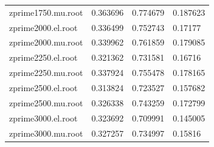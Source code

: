 \begin{table}[H]
\begin{tabular}{l|lll}
  zprime1750.mu.root & 0.363696    & 0.774679  &    0.187623         \\
  zprime2000.el.root & 0.336499    & 0.752743  &    0.17177         \\
  zprime2000.mu.root & 0.339962    & 0.761859  &    0.179085          \\
  zprime2250.el.root & 0.321362    & 0.731581  &    0.16716          \\
  zprime2250.mu.root & 0.337924    & 0.755478  &    0.178165         \\
  zprime2500.el.root & 0.313824    & 0.723527  &    0.157682         \\
  zprime2500.mu.root & 0.326338    & 0.743259  &    0.172799         \\
  zprime3000.el.root & 0.323692    & 0.709991  &    0.145005         \\
  zprime3000.mu.root & 0.327257    & 0.734997  &    0.15816                 
\end{tabular}
\label{tab:eff_b}

\end{table}




